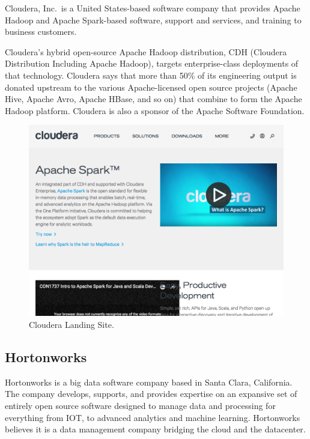 \documentclass[]{book}
\theoremstyle{definition}
\theoremstyle{definition}
\theoremstyle{definition}
\theoremstyle{remark}
\begin{document}
Cloudera, Inc.~is a United States-based software company that provides
Apache Hadoop and Apache Spark-based software, support and services, and
training to business customers.

Cloudera's hybrid open-source Apache Hadoop distribution, CDH (Cloudera
Distribution Including Apache Hadoop), targets enterprise-class
deployments of that technology. Cloudera says that more than 50\% of its
engineering output is donated upstream to the various Apache-licensed
open source projects (Apache Hive, Apache Avro, Apache HBase, and so on)
that combine to form the Apache Hadoop platform. Cloudera is also a
sponsor of the Apache Software Foundation.

\begin{figure}

{\centering \includegraphics[width=13.78in]{images/05-clusters-cloudera} 

}

\caption{Cloudera Landing Site.}\label{fig:cloudera-spark}
\end{figure}

\hypertarget{hortonworks}{%
\subsection{Hortonworks}\label{hortonworks}}

Hortonworks is a big data software company based in Santa Clara,
California. The company develops, supports, and provides expertise on an
expansive set of entirely open source software designed to manage data
and processing for everything from IOT, to advanced analytics and
machine learning. Hortonworks believes it is a data management company
bridging the cloud and the datacenter.
\end{document}
